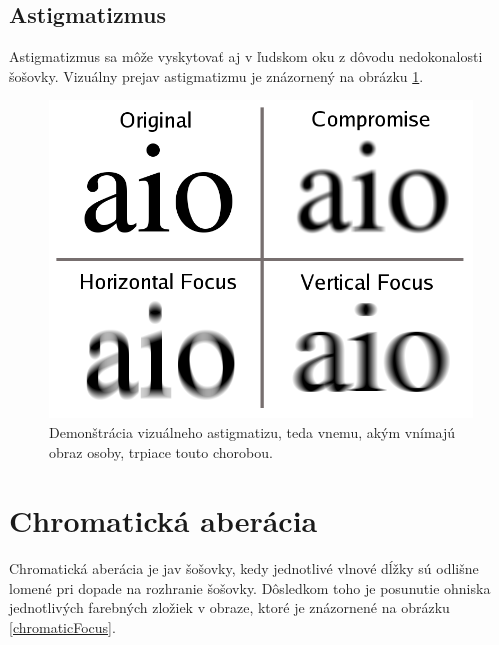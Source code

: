 \subsection{Astigmatizmus}

Astigmatizmus sa môže vyskytovať aj v ľudskom oku z dôvodu nedokonalosti šošovky. Vizuálny prejav
astigmatizmu je znázornený na obrázku \ref{comaDescribe}.

\begin{figure}[h]
    \label{comaDescribe}
\includegraphics[scale=0.30]{obrazky-figures/astigmatism.png}
    \centering \caption{Demonštrácia vizuálneho astigmatizu, teda vnemu, akým vnímajú obraz osoby,
    trpiace touto chorobou.}
\end{figure}



\section{Chromatická aberácia}
Chromatická aberácia je jav šošovky, kedy jednotlivé vlnové dĺžky sú odlišne lomené pri dopade na
rozhranie šošovky. Dôsledkom toho je posunutie ohniska jednotlivých farebných zložiek v obraze, ktoré je
znázornené na obrázku \ref{chromaticFocus}. 

